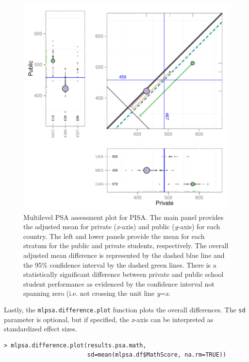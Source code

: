 \documentclass[letterpaper,12p,twoside]{article} %
\begin{document}
\setlength{\belowcaptionskip}{-10pt}
\begin{figure}[h!]
\begin{center}
\includegraphics[width=\textwidth]{../Figures/pisamlpsa.pdf}
\caption[Multilevel PSA assessment plot for PISA]{Multilevel PSA assessment plot for PISA. The main panel provides the adjusted mean for private (\textit{x}-axis) and public (\textit{y}-axis) for each country. The left and lower panels provide the mean for each stratum for the public and private students, respectively. The overall adjusted mean difference is represented by the dashed blue line and the 95\% confidence interval by the dashed green lines. There is a statistically significant difference between private and public school student performance as evidenced by the confidence interval not spanning zero (i.e. not crossing the unit line \textit{y}=\textit{x}.}
\end{center}
\end{figure}
\setlength{\belowcaptionskip}{0pt}

\clearpage
Lastly, the \texttt{mlpsa.difference.plot} function plots the overall differences. The \texttt{sd} parameter is optional, but if specified, the \textit{x}-axis can be interpreted as standardized effect sizes.

\begin{verbatim}
> mlpsa.difference.plot(results.psa.math, 
                        sd=mean(mlpsa.df$MathScore, na.rm=TRUE))
\end{verbatim}
\end{document}
